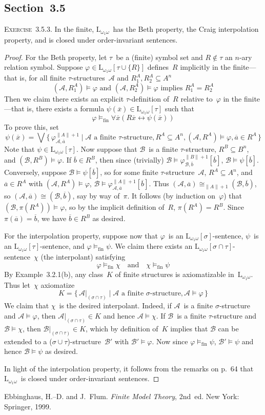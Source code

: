 \documentclass[letterpaper]{article}
\newcommand{\A}{\mathcal{A}}
\newcommand{\B}{\mathcal{B}}
\renewcommand{\L}{\mathrm{L}}
\newcommand{\Loo}{\L_{\omega_1\omega}}
\newcommand{\obar}[1]{\overline{#1}}
\newcommand{\liff}{\leftrightarrow}
\newcommand{\biglor}{\bigvee}
\newcommand{\iso}{\cong}
\newcommand{\fimp}{\mathrel{\models_{\mathrm{fin}}}}
\newcommand{\union}{\cup}
\newcommand{\sect}{\cap}
\newcommand{\card}[1]{\|{#1}\|}
\newcommand{\booksection}[1]{\subsection*{Section~{#1}}}
\newcommand{\exercise}[1]{\noindent\textsc{Exercise~{#1}.}}
\theoremstyle{plain}
\begin{document}
\booksection{3.5}
\exercise{3.5.3}
In the finite, $\Loo$~has the Beth property, the Craig interpolation property, and is closed under order-invariant sentences.
\begin{proof}
For the Beth property, let $\tau$~be a (finite) symbol set and $R\not\in\tau$ an $n$-ary relation symbol. Suppose $\varphi\in\Loo[\tau\union\{R\}]$ defines~$R$ implicitly in the finite---that is, for all finite $\tau$-structures~$\A$ and $R_1^A,R_2^A\subseteq A^n$
$$(\A,R_1^A)\models\varphi\text{ and }(\A,R_2^A)\models\varphi\text{ implies }R_1^A=R_2^A$$
Then we claim there exists an explicit $\tau$-definition of~$R$ relative to~$\varphi$ in the finite---that is, there exists a formula $\psi(\obar{x})\in\Loo[\tau]$ such that
$$\varphi\fimp\forall\obar{x}(R\obar{x}\liff\psi(\obar{x}))$$
To prove this, set
$$\psi(\obar{x})=\biglor\{\,\varphi_{\A,\obar{a}}^{\card{A}+1}\mid\A\text{ a finite $\tau $-structure}, R^A\subseteq A^n,(\A,R^A)\models\varphi, \obar{a}\in R^A\,\}$$
Note that $\psi\in\Loo[\tau]$. Now suppose that $\B$~is a finite $\tau$-structure, $R^B\subseteq B^n$, and $(\B,R^B)\models\varphi$. If $\obar{b}\in R^B$, then since (trivially) $\B\models\varphi_{\B,\obar{b}}^{\card{B}+1}[\obar{b}]$, $\B\models\psi[\obar{b}]$. Conversely, suppose $\B\models\psi[\obar{b}]$, so for some finite $\tau$-structure~$\A$, $R^A\subseteq A^n$, and $\obar{a}\in R^A$ with $(\A,R^A)\models\varphi$, $\B\models\varphi_{\A,\obar{a}}^{\card{A}+1}[\obar{b}]$. Thus $(\A,\obar{a})\iso_{\card{A}+1}(\B,\obar{b})$, so $(\A,\obar{a})\iso(\B,\obar{b})$, say by way of~$\pi$. It follows (by induction on~$\varphi$) that $(\B,\pi(R^A))\models\varphi$, so by the implicit definition of~$R$, $\pi(R^A)=R^B$. Since $\pi(\obar{a})=\obar{b}$, we have $\obar{b}\in R^B$ as desired.

For the interpolation property, suppose now that $\varphi$~is an $\Loo[\sigma]$-sentence, $\psi$~is an $\Loo[\tau]$-sentence, and $\varphi\fimp\psi$. We claim there exists an $\Loo[\sigma\sect\tau]$-sentence~$\chi$ (the interpolant) satisfying
$$\varphi\fimp\chi\quad\text{and}\quad\chi\fimp\psi$$
By Example~3.2.1(b), any class~$K$ of finite structures is axiomatizable in~$\Loo$. Thus let~$\chi$ axiomatize
$$K=\{\,\A|_{(\sigma\sect\tau)}\mid\A\text{ a finite $\sigma $-structure}, \A\models\varphi\,\}$$
We claim that $\chi$~is the desired interpolant. Indeed, if $\A$~is a finite $\sigma$-structure and $\A\models\varphi$, then $\A|_{(\sigma\sect\tau)}\in K$ and hence $\A\models\chi$. If $\B$~is a finite $\tau$-structure and $\B\models\chi$, then $\B|_{(\sigma\sect\tau)}\in K$, which by definition of~$K$ implies that $\B$ can be extended to a ($\sigma\union\tau$)-structure~$\B'$ with $\B'\models\varphi$. Now since $\varphi\fimp\psi$, $\B'\models\psi$ and hence $\B\models\psi$ as desired.

In light of the interpolation property, it follows from the remarks on p.~64 that $\Loo$~is closed under order-invariant sentences.
\end{proof}

\begin{thebibliography}{0}
 Ebbinghaus, H.--D. and J.~Flum. \emph{Finite Model Theory}, 2nd~ed. New York: Springer, 1999.
\end{thebibliography}
\end{document}
